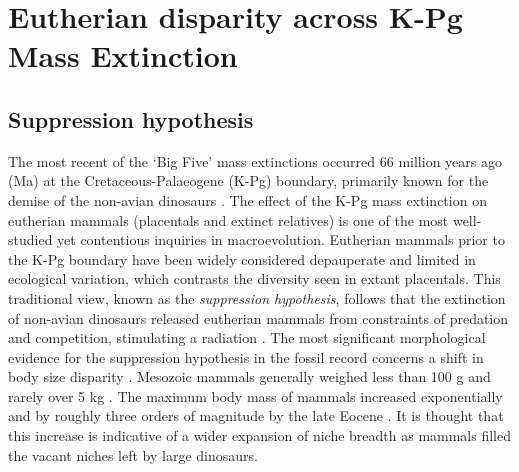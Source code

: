 \documentclass[titlepage]{article}
\begin{document}
\section{Eutherian disparity across K-Pg Mass Extinction}
\subsection{Suppression hypothesis}
The most recent of the `Big Five' mass extinctions occurred 66 million years ago (Ma) at the Cretaceous-Palaeogene (K-Pg) boundary, primarily known for the demise of the non-avian dinosaurs \citep{alvarez_extraterrestrial_1980,schulte_chicxulub_2010,brusatte_extinction_2015}. 
The effect of the K-Pg mass extinction on eutherian mammals (placentals and extinct relatives) is one of the most well-studied yet contentious inquiries in macroevolution.
Eutherian mammals prior to the K-Pg boundary have been widely considered depauperate and limited in ecological variation, which contrasts the diversity seen in extant placentals.
This traditional view, known as the \textit{suppression hypothesis}, follows that the extinction of non-avian  dinosaurs released eutherian mammals from constraints of predation and competition, stimulating a radiation \citep{osborn_law_1902,alroy_fossil_1999,codron_ecological_2013,oleary_placental_2013}. 
The most significant morphological evidence for the suppression hypothesis in the fossil record concerns a shift in body size disparity \citep{alroy_fossil_1999}. 
Mesozoic mammals generally weighed less than 100 g and rarely over 5 kg \citep{benevento_early_2023}. 
The maximum body mass of mammals increased exponentially and by roughly three orders of magnitude by the late Eocene \citep{cooper_body_2010,smith_evolution_2010,raia_rapid_2013,slater_phylogenetic_2013}. 
It is thought that this increase is indicative of a wider expansion of niche breadth as mammals filled the vacant niches left by large dinosaurs.
\end{document}
